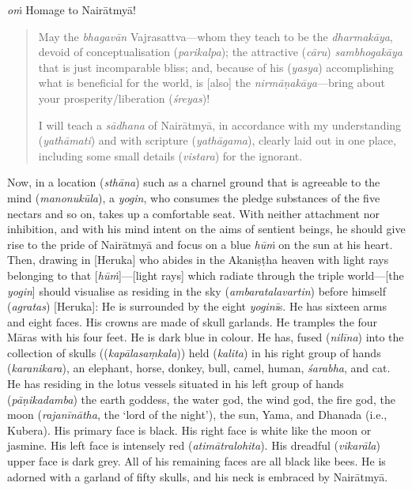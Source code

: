 \documentclass[naipra.tex]{subfiles}
\begin{document}
\noindent \emph{oṁ} Homage to Nairātmyā!

\begin{quote}
	May the \emph{bhagavān} Vajrasattva—whom they teach to be the \emph{dharmakāya}, devoid of conceptualisation (\emph{parikalpa}); the attractive (\emph{cāru}) \emph{sambhogakāya} that is just incomparable bliss; and, because of his (\emph{yasya}) accomplishing what is beneficial for the world, is [also] the \emph{nirmāṇakāya}—bring about your prosperity/liberation (\emph{śreyas})!

	I will teach a \emph{sādhana} of Nairātmyā, in accordance with my understanding (\emph{yathāmati}) and with scripture (\emph{yathāgama}), clearly laid out in one place, including some small details (\emph{vistara}) for the ignorant.
\end{quote}

Now, in a location (\emph{sthāna}) such as a charnel ground that is agreeable to the mind (\emph{manonukūla}), a \emph{yogin}, who consumes the pledge substances of the five nectars and so on, takes up a comfortable seat.
With neither attachment nor inhibition, and with his mind intent on the aims of sentient beings, he should give rise to the pride of Nairātmyā and focus on a blue \emph{hūṁ} on the sun at his heart.
Then, drawing in [Heruka] who abides in the Akaniṣṭha heaven with light rays belonging to that [\emph{hūṁ}]—[light rays] which radiate through the triple world—[the \emph{yogin}] should visualise as residing in the sky (\emph{ambaratalavartin}) before himself (\emph{agratas}) [Heruka]:
He is surrounded by the eight \emph{yoginī}s.
He has sixteen arms and eight faces.
His crowns are made of skull garlands.
He tramples the four Māras with his four feet.
He is dark blue in colour.
He has, fused (\emph{nilīna}) into the collection of skulls ((\emph{kapālasaṃkala})) held (\emph{kalita}) in his right group of hands (\emph{karanikara}), an elephant, horse, donkey, bull, camel, human, \emph{śarabha}, and cat.
He has residing in the lotus vessels situated in his left group of hands (\emph{pāṇikadamba}) the earth goddess, the water god, the wind god, the fire god, the moon (\emph{rajanīnātha}, the `lord of the night'), the sun, Yama, and Dhanada (i.e., Kubera).
His primary face is black.
His right face is white like the moon or jasmine. 
His left face is intensely red (\emph{atimātralohita}).
His dreadful (\emph{vikarāla}) upper face is dark grey.
All of his remaining faces are all black like bees.
He is adorned with a garland of fifty skulls, and his neck is embraced by Nairātmyā. 
\end{document}
